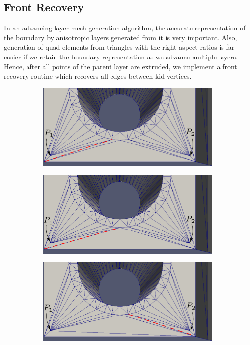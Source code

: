 \documentclass[conf]{new-aiaa}
\begin{document}
\subsection{Front Recovery}

In an advancing layer mesh generation algorithm, the accurate representation of the boundary by anisotropic layers generated from it is very important. Also, generation of quad-elements from triangles with the right aspect ratios is far easier if we retain the boundary representation as we advance multiple layers. Hence, after all points of the parent layer are extruded, we implement a front recovery routine which recovers all edges between kid vertices.

\begin{figure}[hbt!]
\centering
\begin{subfigure}{0.5\textwidth}
  \centering
  \includegraphics[width=.9\linewidth]{force-swapping-edge-recovery/initial-edited.eps}
  \caption{}
  \label{force-swap1}
\end{subfigure}%
\begin{subfigure}{.5\textwidth}
  \centering
  \includegraphics[width=.9\linewidth]{force-swapping-edge-recovery/swap1-edited.eps}
  \caption{}
  \label{force-swap2}
\end{subfigure}
\begin{subfigure}{.5\textwidth}
  \centering
  \includegraphics[width=.9\linewidth]{force-swapping-edge-recovery/swap2-edited.eps}

\end{subfigure}
\end{figure}
\end{document}
